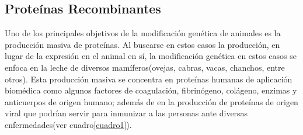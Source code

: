 \documentclass[fleqn,10pt]{SelfArx} %
\begin{document}
\subsection{Proteínas Recombinantes}

Uno de los principales objetivos de la modificación genética de animales es la producción masiva de proteínas. Al buscarse en estos casos la producción, en lugar de la expresión en el animal en sí, la modificación genética en estos casos se enfoca en la leche de diversos mamíferos(ovejas, cabras, vacas, chanchos, entre otros).  Esta producción masiva se concentra en proteínas humanas de aplicación biomédica como algunos factores de coagulación, fibrinógeno, colágeno, enzimas y anticuerpos de origen humano; además de en la producción de proteínas de origen viral que podrían servir para inmunizar a las personas ante diversas enfermedades(ver cuadro\ref{cuadro1})\cite{Durocher15012002, Koszarycz2004, niemann2007transgenic, houdebine2009production}. 
\end{document}
